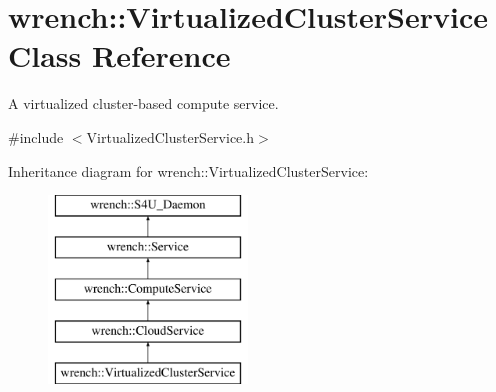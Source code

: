 \hypertarget{classwrench_1_1_virtualized_cluster_service}{}\section{wrench\+:\+:Virtualized\+Cluster\+Service Class Reference}
\label{classwrench_1_1_virtualized_cluster_service}


A virtualized cluster-\/based compute service.  




{\ttfamily \#include $<$Virtualized\+Cluster\+Service.\+h$>$}

Inheritance diagram for wrench\+:\+:Virtualized\+Cluster\+Service\+:\begin{figure}[H]
\begin{center}
\leavevmode
\includegraphics[height=5.000000cm]{classwrench_1_1_virtualized_cluster_service}
\end{center}
\end{figure}
